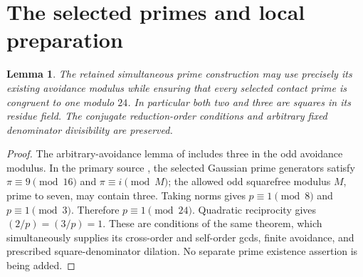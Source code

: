 \documentclass[11pt,a4paper]{article}
\newtheorem{lemma}[theorem]{Lemma}
\begin{document}
\section{The selected primes and local preparation}

\begin{lemma}\label{lem:splitting}
The retained simultaneous prime construction may use precisely its
existing avoidance modulus while ensuring that every selected contact
prime is congruent to one modulo $24$. In particular both two and
three are squares in its residue field. The conjugate reduction-order
conditions and arbitrary fixed denominator divisibility are preserved.
\end{lemma}
\begin{proof}
The arbitrary-avoidance lemma of \cite{Arithmetic} includes three
in the odd avoidance modulus. In the primary source
\cite[Theorem 4.1]{Sun}, the selected Gaussian prime generators
satisfy $\pi\equiv9\pmod{16}$ and $\pi\equiv i\pmod M$;
the allowed odd squarefree modulus $M$, prime to seven, may contain
three. Taking norms gives $p\equiv1\pmod8$ and
$p\equiv1\pmod3$. Therefore $p\equiv1\pmod{24}$.
Quadratic reciprocity gives $(2/p)=(3/p)=1$.
These are conditions of the same theorem, which simultaneously
supplies its cross-order and self-order gcds, finite avoidance, and
prescribed square-denominator dilation. No separate prime existence
assertion is being added.
\end{proof}
\end{document}
